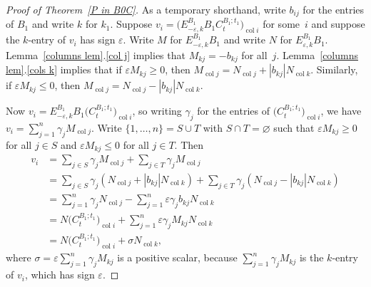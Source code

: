 \documentclass[10pt]{article}
\theoremstyle{definition}
\theoremstyle{remark}
\numberwithin{equation}{section}
\newcommand{\ep}{\varepsilon}
\newcommand{\col}{\operatorname{col}}
\newcommand{\set}[1]{{\lbrace #1 \rbrace}}
\newcommand{\0}{{\mathbf{0}}}
\begin{document}
\begin{proof}[Proof of Theorem~\ref{P in B0C}]
As a temporary shorthand, write $b_{ij}$ for the entries of $B_1$ and write $k$ for $k_1$.
Suppose $v_i=\bigl(E^{B_1}_{-\ep,k}B_1C_t^{B_1;t_1}\bigr)_{\col i}$ for some~$i$ and suppose the $k$-entry of $v_i$ has sign $\ep$.
Write $M$ for $E^{B_1}_{-\ep,k}B_1$ and write $N$ for $E^{B_1}_{\ep,k}B_1$.
Lemma~\ref{columns lem}.\ref{col j} implies that $M_{kj}=-b_{kj}$ for all~$j$.
Lemma~\ref{columns lem}.\ref{cols k} implies that if $\ep M_{kj}\ge0$, then $M_{\col j}=N_{\col j}+|b_{kj}|N_{\col k}$.
Similarly, if $\ep M_{kj}\le0$, then $M_{\col j}=N_{\col j}-|b_{kj}|N_{\col k}$.


Now $v_i=E^{B_1}_{-\ep,k}B_1\bigl(C_t^{B_1;t_1}\bigr)_{\col i}$, so writing $\gamma_j$ for the entries of $\bigl(C_t^{B_1;t_1}\bigr)_{\col i}$, we have $v_i=\sum_{j=1}^n\gamma_jM_{\col j}$.
Write $\set{1,\ldots,n}=S\cup T$ with $S\cap T=\varnothing$ such that $\ep M_{kj}\ge0$ for all $j\in S$ and $\ep M_{kj}\le0$ for all $j\in T$.
Then
\begin{align*}
v_i
&=\sum_{j\in S}\gamma_jM_{\col j}+\sum_{j\in T}\gamma_jM_{\col j}\\
&=\sum_{j\in S}\gamma_j(N_{\col j}+|b_{kj}|N_{\col k})+\sum_{j\in T}\gamma_j(N_{\col j}-|b_{kj}|N_{\col k})\\
&=\sum_{j=1}^n\gamma_jN_{\col j}-\sum_{j=1}^n\ep\gamma_jb_{kj}N_{\col k}\\
&=N\bigl(C_t^{B_1;t_1}\bigr)_{\col i}+\sum_{j=1}^n\ep\gamma_jM_{kj}N_{\col k}\\
&=N\bigl(C_t^{B_1;t_1}\bigr)_{\col i}+\sigma N_{\col k},
\end{align*}
where $\sigma=\ep\sum_{j=1}^n\gamma_jM_{kj}$ is a positive scalar, because $\sum_{j=1}^n\gamma_jM_{kj}$ is the $k$-entry of $v_i$, which has sign $\ep$.


\end{proof}
\end{document}
